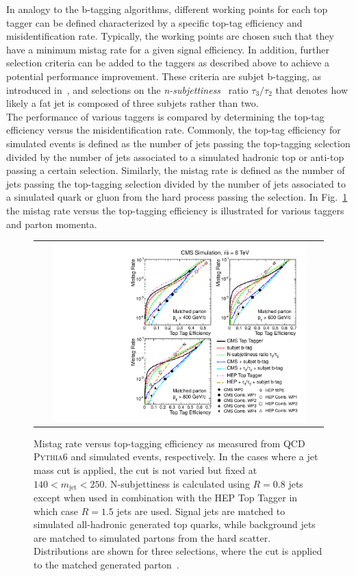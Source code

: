 In analogy to the b-tagging algorithms, different working points for each top tagger can be defined characterized by a specific top-tag efficiency and misidentification rate. Typically, the working points are chosen such that they have a minimum mistag rate for a given signal efficiency. In addition, further selection criteria can be added to the taggers as described above to achieve a potential performance improvement. These criteria are subjet b-tagging, as introduced in~\cite{CMS-PAS-BTV-13-001}, and selections on the \textit{n-subjettiness}~\cite{Thaler:2010tr, Thaler:2011gf} ratio $\tau_3/\tau_2$ that denotes how likely a fat jet is composed of three subjets rather than two. \\
The performance of various taggers is compared by determining the top-tag efficiency versus the misidentification rate. Commonly, the top-tag efficiency for simulated events is defined as the number of jets passing the top-tagging selection divided by the number of jets associated to a simulated hadronic top or anti-top passing a certain \pt selection. Similarly, the mistag rate is defined as the number of jets passing the top-tagging selection divided by the number of jets associated to a simulated quark or gluon from the hard process passing the \pt selection. In Fig.~\ref{fig:boosted_top_roc} the mistag rate versus the top-tagging efficiency is illustrated for various taggers and parton momenta.
\begin{figure}[!t] 
  \centering 
  \begin{tabular}{c}
    \includegraphics[width=0.9\textwidth]{figures/TopTag_ROC_Curves.pdf}  
  \end{tabular}
  \caption{Mistag rate versus top-tagging efficiency as measured from QCD \textsc{Pythia6} and \powheg \ttbar simulated events, respectively. In the cases where a jet mass cut is applied, the cut is not varied but fixed at $140 < m_\mathrm{jet} < 250$\gev. N-subjettiness is calculated using $R = 0.8$ jets except when used in combination with the HEP Top Tagger in which case $R = 1.5$ jets are used. Signal jets are matched to simulated all-hadronic generated top quarks, while background jets are matched to simulated partons from the hard scatter. Distributions are shown for three \pt selections, where the \pt cut is applied to the matched generated parton~\cite{CMS:2014fya}.}
  \label{fig:boosted_top_roc}
\end{figure}
